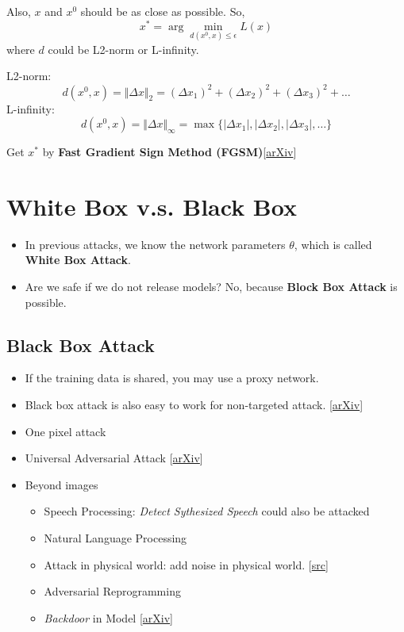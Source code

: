 \documentclass[11pt]{book}
\begin{document}
Also, $x$ and $x^0$ should be as close as possible. So,
\begin{displaymath}
    x^{\ast}=\arg\min_{d(x^0,x)\le\epsilon}L(x)
\end{displaymath}
where $d$ could be L2-norm or L-infinity.

L2-norm:
\[
    d(x^0,x)=\Vert\Delta x\Vert_2=(\Delta x_1)^2+(\Delta x_2)^2+(\Delta x_3)^2+\dots
\]
L-infinity:
\begin{displaymath}
    d(x^0,x)=\Vert\Delta x\Vert_{\infty}=\max\{\vert\Delta x_1\vert,\vert\Delta x_2\vert,\vert\Delta x_3\vert,\dots\}
\end{displaymath}

Get $x^{\ast}$ by \textbf{Fast Gradient Sign Method (FGSM)}[\href{https://arxiv.org/abs/1412.6572)}{arXiv}]

\section{White Box v.s. Black Box}
\begin{itemize}
    \item In previous attacks, we know the network parameters $\theta$, which is called \textbf{White Box Attack}.
    \item Are we safe if we do not release models? No, because \textbf{Block Box Attack} is possible.
\end{itemize}
\subsection{Black Box Attack}
\begin{itemize}
    \item If the training data is shared, you may use a proxy network.
    \item Black box attack is also easy to work for non-targeted attack. [\href{https://arxiv.org/pdf/1611.02770.pdf}{arXiv}]
    \item One pixel attack
    \item Universal Adversarial Attack [\href{https://arxiv.org/abs/1610.08401}{arXiv}]
    \item Beyond images
    \begin{itemize}
        \item Speech Processing: \textit{Detect Sythesized Speech} could also be attacked
        \item Natural Language Processing
        \item Attack in physical world: add noise in physical world. [\href{https://www.cs.cmu.edu/~sbhagava/papers/face-rec-ccs16.pdf}{src}]
        \item Adversarial Reprogramming
        \item \textit{Backdoor} in Model [\href{https://arxiv.org/abs/1804.00792}{arXiv}]
    \end{itemize}
\end{itemize}
\end{document}
